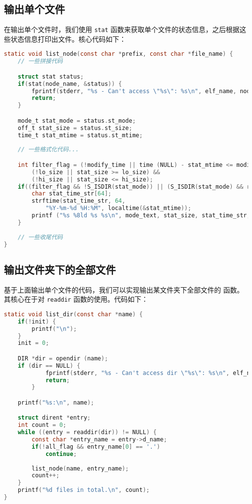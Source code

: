 \documentclass[blue,normal,cn]{elegantnote}
\newcommand{\code}[1]{\colorbox{light-gray}{\texttt{#1}}}
\begin{document}
\subsection{输出单个文件}
在输出单个文件时，我们使用 \code{stat} 函数来获取单个文件的状态信息，之后根据这些状态信息打印出文件。核心代码如下：

\begin{lstlisting}[language=C]
static void list_node(const char *prefix, const char *file_name) {
	// 一些拼接代码

    struct stat status;
    if(stat(node_name, &status)) {
        fprintf(stderr, "%s - Can't access \"%s\": %s\n", elf_name, node_name, strerror(errno));
        return;
    }

    mode_t stat_mode = status.st_mode;
    off_t stat_size = status.st_size;
	time_t stat_mtime = status.st_mtime;
	
    // 一些格式化代码...

    int filter_flag = (!modify_time || time (NULL) - stat_mtime <= modify_time) &&
        (!lo_size || stat_size >= lo_size) &&
        (!hi_size || stat_size <= hi_size);
    if((filter_flag && !S_ISDIR(stat_mode)) || (S_ISDIR(stat_mode) && recursive_flag)) {
        char stat_time_str[64];
        strftime(stat_time_str, 64, 
            "%Y-%m-%d %H:%M", localtime(&stat_mtime));
        printf ("%s %8ld %s %s\n", mode_text, stat_size, stat_time_str, file_name);
    }
	
	// 一些收尾代码
}
\end{lstlisting}

\subsection{输出文件夹下的全部文件}

基于上面输出单个文件的代码，我们可以实现输出某文件夹下全部文件的
函数。其核心在于对 \code{readdir} 函数的使用。代码如下：

\begin{lstlisting}[language=C]
static void list_dir(const char *name) {
    if(!init) {
        printf("\n");
    }
    init = 0;

    DIR *dir = opendir (name);
    if (dir == NULL) {
            fprintf(stderr, "%s - Can't access dir \"%s\": %s\n", elf_name, name, strerror(errno));
            return;
        }

    printf("%s:\n", name);

    struct dirent *entry;
    int count = 0;
    while ((entry = readdir(dir)) != NULL) {
        const char *entry_name = entry->d_name;
        if(!all_flag && entry_name[0] == '.')
            continue;
        
        list_node(name, entry_name);
        count++;
    }
    printf("%d files in total.\n", count);
}
\end{lstlisting}
\end{document}
